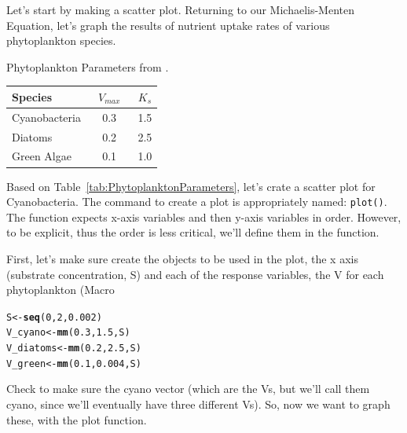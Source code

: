 \documentclass{tufte-handout}\usepackage[]{graphicx}\usepackage[]{xcolor}
\makeatletter
\newcommand{\hlnum}[1]{\textcolor[rgb]{0.686,0.059,0.569}{#1}}%
\newcommand{\hlstd}[1]{\textcolor[rgb]{0.345,0.345,0.345}{#1}}%
\newcommand{\hlkwb}[1]{\textcolor[rgb]{0.69,0.353,0.396}{#1}}%
\newcommand{\hlkwd}[1]{\textcolor[rgb]{0.737,0.353,0.396}{\textbf{#1}}}%
\newenvironment{kframe}{%
 \def\at@end@of@kframe{}%
 \ifinner\ifhmode%
  \def\at@end@of@kframe{\end{minipage}}%
  \begin{minipage}{\columnwidth}%
 \fi\fi%
 \def\FrameCommand##1{\hskip\@totalleftmargin \hskip-\fboxsep
 \colorbox{shadecolor}{##1}\hskip-\fboxsep
     \hskip-\linewidth \hskip-\@totalleftmargin \hskip\columnwidth}%
 \MakeFramed {\advance\hsize-\width
   \@totalleftmargin\z@ \linewidth\hsize
   \@setminipage}}%
 {\par\unskip\endMakeFramed%
 \at@end@of@kframe}
\newenvironment{knitrout}{}{} %
\makeatother
\begin{document}
Let's start by making a scatter plot. Returning to our Michaelis-Menten Equation, let's graph the results of nutrient uptake rates of various phytoplankton species. 

\begin{margintable}
	\caption{Phytoplankton Parameters from \citep{REF}.}
		\begin{tabular}{lcc}
		\toprule
Species &\ $V_{max}$\ & $K_s$ \\
\midrule
Cyanobacteria & 0.3 & 1.5 \\
Diatoms 			& 0.2 & 2.5 \\
Green Algae   & 0.1 & 1.0 \\	
\bottomrule
		\end{tabular}
	\label{tab:PhytoplanktonParameters}
\end{margintable}

Based on Table~\ref{tab:PhytoplanktonParameters}, let's crate a scatter plot for Cyanobacteria. The command to create a plot is appropriately named: \texttt{plot()}. The function expects x-axis variables and then y-axis variables in order. However, to be explicit, thus the order is less critical, we'll define them in the function.

First, let's make sure create the objects to be used in the plot, \ie the x axis (substrate concentration, S) and each of the response variables, the V for each phytoplankton (Macro

\begin{knitrout}
\color{fgcolor}\begin{kframe}
\begin{alltt}
\hlstd{S} \hlkwb{<-} \hlkwd{seq}\hlstd{(}\hlnum{0}\hlstd{,}\hlnum{2}\hlstd{,} \hlnum{0.002}\hlstd{)}
\hlstd{V_cyano}   \hlkwb{<-} \hlkwd{mm}\hlstd{(}\hlnum{0.3}\hlstd{,} \hlnum{1.5}\hlstd{, S)}
\hlstd{V_diatoms} \hlkwb{<-} \hlkwd{mm}\hlstd{(}\hlnum{0.2}\hlstd{,} \hlnum{2.5}\hlstd{, S)}
\hlstd{V_green}   \hlkwb{<-} \hlkwd{mm}\hlstd{(}\hlnum{0.1}\hlstd{,} \hlnum{0.004}\hlstd{, S)}
\end{alltt}
\end{kframe}
\end{knitrout}

Check to make sure the cyano vector (which are the Vs, but we'll call them cyano, since we'll eventually have three different Vs). So, now we want to graph these, with the plot function.
\end{document}
